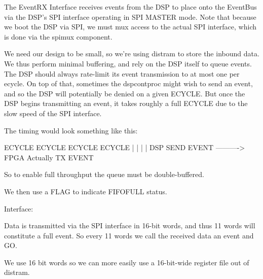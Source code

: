 The EventRX Interface receives events from the DSP to place onto the
EventBus via the DSP's SPI interface operating in SPI MASTER mode.
Note that because we boot the DSP via SPI, we must mux access to the
actual SPI interface, which is done via the spimux component. 

We need our design to be small, so we're using distram to store the
inbound data. We thus perform minimal buffering, and rely on the DSP
itself to queue events. The DSP should always rate-limit its event
transmission to at most one per ecycle. On top of that, sometimes the
dspcontproc might wish to send an event, and so the DSP will
potentially be denied on a given ECYCLE. But once the DSP begins
transmitting an event, it takes roughly a full ECYCLE due to the slow
speed of the SPI interface. 

The timing would look something like this:

  ECYCLE                 ECYCLE             ECYCLE               ECYCLE
    |                      |                  |                    |
DSP  SEND EVENT ----------> 
FPGA                        Actually TX EVENT

So to enable full throughput the queue must be double-buffered.

We then use a FLAG to indicate FIFOFULL status. 

Interface: 

Data is transmitted via the SPI interface in 16-bit words, and thus
11 words will constitute a full event. So every 11 words we call the 
received data an event and GO.

We use 16 bit words so we can more easily use a 16-bit-wide register
file out of distram. 

